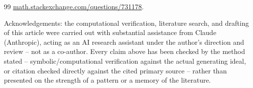 \documentclass[a4paper,11pt]{scrartcl}
\begin{document}
\begin{thebibliography}{99}
\href{https://math.stackexchange.com/questions/731178/what-can-we-say-about-the-image-of-a-regular-map}{math.stackexchange.com/questions/731178}. 
\end{thebibliography}


Acknowledgements: the computational verification, literature search, and drafting of this article were carried out with substantial assistance from Claude (Anthropic), acting as an AI research assistant under the author's direction and review -- not as a co-author. Every claim above has been checked by the method stated -- symbolic/computational verification against the actual generating ideal, or citation checked directly against the cited primary source -- rather than presented on the strength of a pattern or a memory of the literature.
\end{document}
